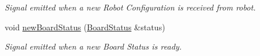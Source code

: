 \begin{DoxyCompactItemize}
\begin{DoxyCompactList}\small\item\em Signal emitted when a new Robot Configuration is received from robot. \end{DoxyCompactList}\item 
\hypertarget{classroboctrl_1_1_robo_controller_s_d_k_af760a666eb8e891c0e158e28fab1fb3a}{void \hyperlink{classroboctrl_1_1_robo_controller_s_d_k_af760a666eb8e891c0e158e28fab1fb3a}{new\-Board\-Status} (\hyperlink{struct___board_status}{Board\-Status} \&status)}\label{classroboctrl_1_1_robo_controller_s_d_k_af760a666eb8e891c0e158e28fab1fb3a}

\begin{DoxyCompactList}\small\item\em Signal emitted when a new Board Status is ready. \end{DoxyCompactList}\end{DoxyCompactItemize}
